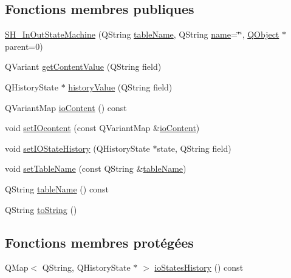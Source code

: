 \subsection*{Fonctions membres publiques}
\begin{DoxyCompactItemize}
\item 
\hyperlink{classSH__InOutStateMachine_abd780037922920c674b43d80c2b50d16}{S\-H\-\_\-\-In\-Out\-State\-Machine} (Q\-String \hyperlink{classSH__InOutStateMachine_a18b07a985695100612bbcbda870933b4}{table\-Name}, Q\-String \hyperlink{classSH__NamedObject_a970f265df31b28b2179bbbceb6170ac2}{name}=\char`\"{}\char`\"{}, \hyperlink{classQObject}{Q\-Object} $\ast$parent=0)
\item 
Q\-Variant \hyperlink{classSH__InOutStateMachine_a2cdd914f1e597ac52d021106eec75c89}{get\-Content\-Value} (Q\-String field)
\item 
Q\-History\-State $\ast$ \hyperlink{classSH__InOutStateMachine_a84fb2b2c2105cae9c590c0d15960854a}{history\-Value} (Q\-String field)
\item 
Q\-Variant\-Map \hyperlink{classSH__InOutStateMachine_a79b456cb2e353cb61ef9fe19c97fc8fb}{io\-Content} () const 
\item 
void \hyperlink{classSH__InOutStateMachine_a23a925522339132a51d16a7cff9074b9}{set\-I\-Ocontent} (const Q\-Variant\-Map \&\hyperlink{classSH__InOutStateMachine_a79b456cb2e353cb61ef9fe19c97fc8fb}{io\-Content})
\item 
void \hyperlink{classSH__InOutStateMachine_a4b72e6da839782a211692a4d728c3925}{set\-I\-O\-State\-History} (Q\-History\-State $\ast$state, Q\-String field)
\item 
void \hyperlink{classSH__InOutStateMachine_a437a730d07ddd15bd96314ab0b6cf40e}{set\-Table\-Name} (const Q\-String \&\hyperlink{classSH__InOutStateMachine_a18b07a985695100612bbcbda870933b4}{table\-Name})
\item 
Q\-String \hyperlink{classSH__InOutStateMachine_a18b07a985695100612bbcbda870933b4}{table\-Name} () const 
\item 
Q\-String \hyperlink{classSH__InOutStateMachine_a60ecd7de03d948e2d1e9cbedb5c3e5fa}{to\-String} ()
\end{DoxyCompactItemize}
\subsection*{Fonctions membres protégées}
\begin{DoxyCompactItemize}
\item 
Q\-Map$<$ Q\-String, Q\-History\-State $\ast$ $>$ \hyperlink{classSH__InOutStateMachine_a4ec3ebb4c40ea57c63afdf5976e62a94}{io\-States\-History} () const 
\end{DoxyCompactItemize}
